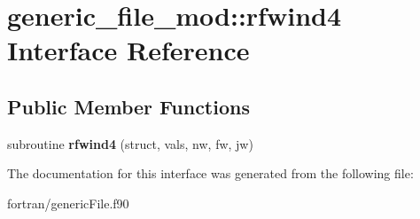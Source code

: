\hypertarget{interfacegeneric__file__mod_1_1rfwind4}{}\section{generic\+\_\+file\+\_\+mod\+:\+:rfwind4 Interface Reference}
\label{interfacegeneric__file__mod_1_1rfwind4}
\subsection*{Public Member Functions}
\begin{DoxyCompactItemize}
\item 
\mbox{\label{interfacegeneric__file__mod_1_1rfwind4_acc33e98a146ec880de49f7896fc27cce}} 
subroutine {\bfseries rfwind4} (struct, vals, nw, fw, jw)
\end{DoxyCompactItemize}


The documentation for this interface was generated from the following file\+:\begin{DoxyCompactItemize}
\item 
fortran/generic\+File.\+f90\end{DoxyCompactItemize}
